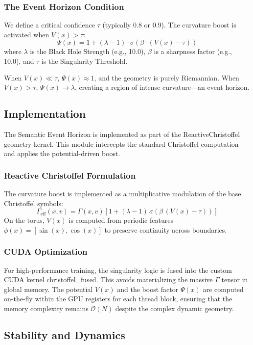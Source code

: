 \documentclass{article}
\numberwithin{equation}{section}
\begin{document}
\subsubsection{The Event Horizon Condition}
We define a critical confidence $\tau$ (typically 0.8 or 0.9). The curvature boost is activated when $V(x) > \tau$:
\[
\Psi(x) = 1 + (\lambda - 1) \cdot \sigma\left( \beta \cdot (V(x) - \tau) \right)
\]
where $\lambda$ is the Black Hole Strength (e.g., 10.0), $\beta$ is a sharpness factor (e.g., 10.0), and $\tau$ is the Singularity Threshold.

When $V(x) \ll \tau$, $\Psi(x) \approx 1$, and the geometry is purely Riemannian. When $V(x) > \tau$, $\Psi(x) \to \lambda$, creating a region of intense curvature---an event horizon.

\subsection{Implementation}
The Semantic Event Horizon is implemented as part of the ReactiveChristoffel geometry kernel. This module intercepts the standard Christoffel computation and applies the potential-driven boost.

\subsubsection{Reactive Christoffel Formulation}
The curvature boost is implemented as a multiplicative modulation of the base Christoffel symbols:
\[
\Gamma_{\text{eff}}(x,v) = \Gamma(x,v)\left[1 + (\lambda - 1)\,\sigma\!\left(\beta\,(V(x)-\tau)\right)\right]
\]
On the torus, $V(x)$ is computed from periodic features $\phi(x)=[\sin(x),\cos(x)]$ to preserve continuity across boundaries.

\subsubsection{CUDA Optimization}
For high-performance training, the singularity logic is fused into the custom CUDA kernel christoffel\_fused. This avoids materializing the massive $\Gamma$ tensor in global memory. The potential $V(x)$ and the boost factor $\Psi(x)$ are computed on-the-fly within the GPU registers for each thread block, ensuring that the memory complexity remains $\mathcal{O}(N)$ despite the complex dynamic geometry.

\subsection{Stability and Dynamics}
\end{document}
